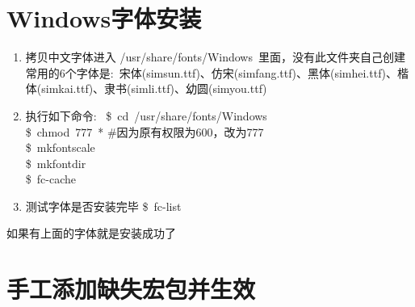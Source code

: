 \documentclass[10pt, oneside, a4paper]{article}      %
\begin{document}
\section{Windows字体安装}
\begin{enumerate}
	\item 拷贝中文字体进入 \textrm{/usr/share/fonts/Windows}~里面，没有此文件夹自己创建\\
		常用的6个字体是:~宋体(\textrm{simsun.ttf})、仿宋(\textrm{simfang.ttf})、黑体(\textrm{simhei.ttf})、楷体(\textrm{simkai.ttf})、隶书(\textrm{simli.ttf})、幼圆(\textrm{simyou.ttf})
	\item 执行如下命令:~
\$~\textrm{cd~/usr/share/fonts/Windows}\\
\$~\textrm{chmod~777~*} \#因为原有权限为600，改为777\\
\$~\textrm{mkfontscale}\\
\$~\textrm{mkfontdir}\\
\$~\textrm{fc-cache}
\item 测试字体是否安装完毕
	\$~\textrm{fc-list}
\end{enumerate}
如果有上面的字体就是安装成功了

\section{手工添加缺失宏包并生效}
\end{document}
